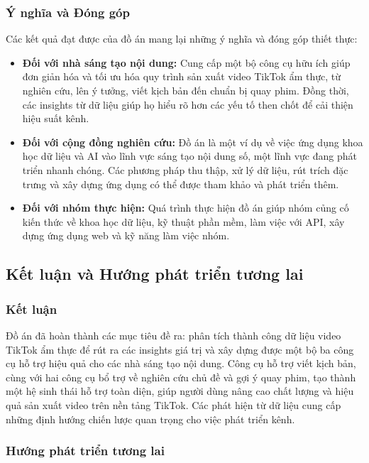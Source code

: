 \subsubsection{Ý nghĩa và Đóng góp}

\noindent
Các kết quả đạt được của đồ án mang lại những ý nghĩa và đóng góp thiết thực:
\begin{itemize}
    \item \textbf{Đối với nhà sáng tạo nội dung:} Cung cấp một bộ công cụ hữu ích giúp đơn giản hóa và tối ưu hóa quy trình sản xuất video TikTok ẩm thực, từ nghiên cứu, lên ý tưởng, viết kịch bản đến chuẩn bị quay phim. Đồng thời, các insights từ dữ liệu giúp họ hiểu rõ hơn các yếu tố then chốt để cải thiện hiệu suất kênh.
    
    \item \textbf{Đối với cộng đồng nghiên cứu:} Đồ án là một ví dụ về việc ứng dụng khoa học dữ liệu và AI vào lĩnh vực sáng tạo nội dung số, một lĩnh vực đang phát triển nhanh chóng. Các phương pháp thu thập, xử lý dữ liệu, rút trích đặc trưng và xây dựng ứng dụng có thể được tham khảo và phát triển thêm.
    
    \item \textbf{Đối với nhóm thực hiện:} Quá trình thực hiện đồ án giúp nhóm củng cố kiến thức về khoa học dữ liệu, kỹ thuật phần mềm, làm việc với API, xây dựng ứng dụng web và kỹ năng làm việc nhóm.
\end{itemize}

\subsection{Kết luận và Hướng phát triển tương lai}

\subsubsection{Kết luận}

Đồ án đã hoàn thành các mục tiêu đề ra: phân tích thành công dữ liệu video TikTok ẩm thực để rút ra các insights giá trị và xây dựng được một bộ ba công cụ hỗ trợ hiệu quả cho các nhà sáng tạo nội dung. Công cụ hỗ trợ viết kịch bản, cùng với hai công cụ bổ trợ về nghiên cứu chủ đề và gợi ý quay phim, tạo thành một hệ sinh thái hỗ trợ toàn diện, giúp người dùng nâng cao chất lượng và hiệu quả sản xuất video trên nền tảng TikTok. Các phát hiện từ dữ liệu cung cấp những định hướng chiến lược quan trọng cho việc phát triển kênh.

\subsubsection{Hướng phát triển tương lai}

